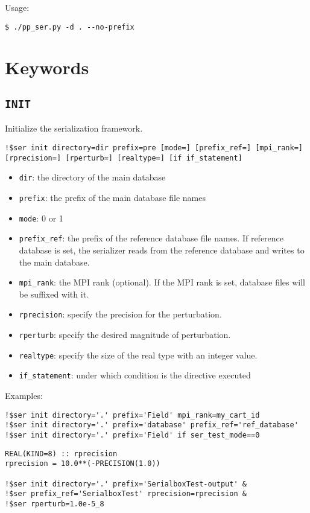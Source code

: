 \documentclass{article}
\begin{document}
Usage:
\begin{lstlisting}
$ ./pp_ser.py -d . --no-prefix
\end{lstlisting}

\section{Keywords}

\subsection{\texttt{INIT}}
Initialize the serialization framework.

\begin{lstlisting}
!$ser init directory=dir prefix=pre [mode=] [prefix_ref=] [mpi_rank=] [rprecision=] [rperturb=] [realtype=] [if if_statement]
\end{lstlisting}

\begin{itemize}
\item \texttt{dir}: the directory of the main database
\item \texttt{prefix}: the prefix of the main database file names
\item \texttt{mode}: 0 or 1
\item \texttt{prefix\_ref}: the prefix of the reference database file names. If reference database is set, the serializer reads from the reference database and writes to the main database.
\item \texttt{mpi\_rank}: the MPI rank (optional). If the MPI rank is set, database files will be suffixed with it. 
\item \texttt{rprecision}: specify the precision for the perturbation.
\item \texttt{rperturb}: specify the desired magnitude of perturbation.
\item \texttt{realtype}: specify the size of the real type with an integer value.
\item \texttt{if\_statement}: under which condition is the directive executed
\end{itemize}

Examples:
\begin{lstlisting}
!$ser init directory='.' prefix='Field' mpi_rank=my_cart_id
!$ser init directory='.' prefix='database' prefix_ref='ref_database'
!$ser init directory='.' prefix='Field' if ser_test_mode==0
\end{lstlisting}

\begin{lstlisting}
REAL(KIND=8) :: rprecision
rprecision = 10.0**(-PRECISION(1.0))

!$ser init directory='.' prefix='SerialboxTest-output' &
!$ser prefix_ref='SerialboxTest' rprecision=rprecision &
!$ser rperturb=1.0e-5_8
\end{lstlisting}
\end{document}
